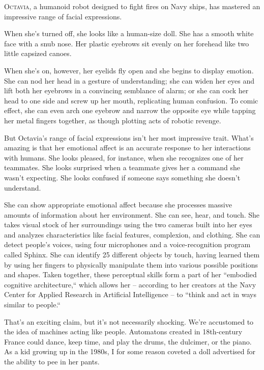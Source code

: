 \documentclass[9pt,a4paper]{extarticle}
\newlength{\newsleading}
\begin{document}
\fontsize{9.5}{\newsleading}\selectfont
\lineskiplimit=-1000pt

\linenumbers\lettrine[lines=4,lhang=0.05,nindent=0pt]{O}{ctavia}, a humanoid robot designed to fight fires on Navy ships, has mastered an impressive range of facial expressions.

When she’s turned off, she looks like a human-size doll. She has a smooth white face with a snub nose. Her plastic eyebrows sit evenly on her forehead like two little capsized canoes.

When she’s on, however, her eyelids fly open and she begins to display emotion. She can nod her head in a gesture of understanding; she can widen her eyes and lift both her eyebrows in a convincing semblance of alarm; or she can cock her head to one side and screw up her mouth, replicating human confusion. To comic effect, she can even arch one eyebrow and narrow the opposite eye while tapping her metal fingers together, as though plotting acts of robotic revenge.

But Octavia’s range of facial expressions isn’t her most impressive trait. What’s amazing is that her emotional affect is an accurate response to her interactions with humans. She looks pleased, for instance, when she recognizes one of her teammates. She looks surprised when a teammate gives her a command she wasn’t expecting. She looks confused if someone says something she doesn’t understand.

She can show appropriate emotional affect because she processes massive amounts of information about her environment. She can see, hear, and touch. She takes visual stock of her surroundings using the two cameras built into her eyes and analyzes characteristics like facial features, complexion, and clothing. She can detect people’s voices, using four microphones and a voice-recognition program called Sphinx. She can identify 25 different objects by touch, having learned them by using her fingers to physically manipulate them into various possible positions and shapes. Taken together, these perceptual skills form a part of her “embodied cognitive architecture,“ which allows her – according to her creators at the Navy Center for Applied Research in Artificial Intelligence – to “think and act in ways similar to people.“

That’s an exciting claim, but it’s not necessarily shocking. We’re accustomed to the idea of machines acting like people. Automatons created in 18th-century France could dance, keep time, and play the drums, the dulcimer, or the piano. As a kid growing up in the 1980s, I for some reason coveted a doll advertised for the ability to pee in her pants.
\end{document}
